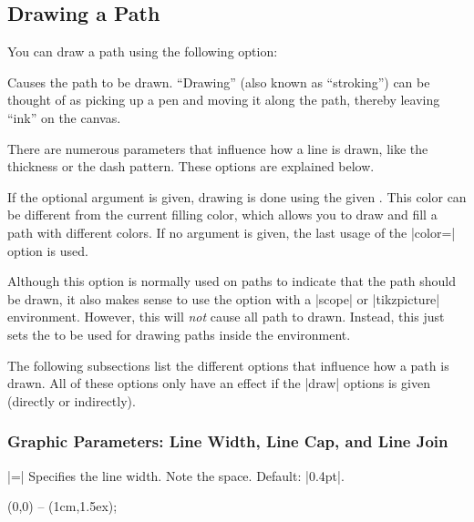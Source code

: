 \subsection{Drawing a Path}

You can draw a path using the following option:
\begin{itemize}
  Causes the path to be drawn. ``Drawing'' (also known as
  ``stroking'') can be thought of as picking up a pen and moving it
  along the path, thereby leaving ``ink'' on the canvas.

  There are numerous parameters that influence how a line is drawn,
  like the thickness or the dash pattern. These options are explained
  below.

  If the optional  argument is given, drawing is done
  using the given . This color can be different from the
  current filling color, which allows you to draw and fill a path with
  different colors. If no  argument is given, the last
  usage of the |color=| option is used.

  Although this option is normally used on paths to indicate that the
  path should be drawn, it also makes sense to use the option with a
  |{scope}| or |{tikzpicture}| environment. However, this will
  \emph{not} cause all path to drawn. Instead, this just sets the
   to be used for drawing paths inside the environment.

\begin{codeexample}[]
\end{codeexample}
\end{itemize}

The following subsections list the different options that influence
how a path is drawn. All of these options only have an effect if the
|draw| options is given (directly or indirectly).

\subsubsection{Graphic Parameters: Line Width, Line Cap, and Line Join}

\label{section-cap-joins}

\begin{itemize}
  |=|
  Specifies the line width. Note the space. Default: |0.4pt|.

\begin{codeexample}[]
  \tikz \draw[line width=5pt] (0,0) -- (1cm,1.5ex);
\end{codeexample}
\end{itemize}

